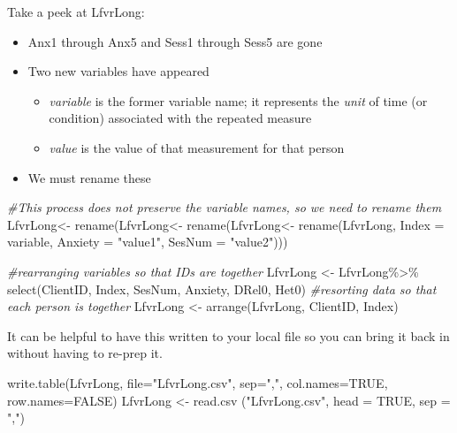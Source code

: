 \documentclass[
  english,
]{book}
\newenvironment{Shaded}{\begin{snugshade}}{\end{snugshade}}
\newcommand{\AttributeTok}[1]{\textcolor[rgb]{0.77,0.63,0.00}{#1}}
\newcommand{\CommentTok}[1]{\textcolor[rgb]{0.56,0.35,0.01}{\textit{#1}}}
\newcommand{\ConstantTok}[1]{\textcolor[rgb]{0.00,0.00,0.00}{#1}}
\newcommand{\FunctionTok}[1]{\textcolor[rgb]{0.00,0.00,0.00}{#1}}
\newcommand{\NormalTok}[1]{#1}
\newcommand{\OtherTok}[1]{\textcolor[rgb]{0.56,0.35,0.01}{#1}}
\newcommand{\SpecialCharTok}[1]{\textcolor[rgb]{0.00,0.00,0.00}{#1}}
\newcommand{\StringTok}[1]{\textcolor[rgb]{0.31,0.60,0.02}{#1}}
\providecommand{\tightlist}{%
  \setlength{\itemsep}{0pt}\setlength{\parskip}{0pt}}
\begin{document}
Take a peek at LfvrLong:

\begin{itemize}
\tightlist
\item
  Anx1 through Anx5 and Sess1 through Sess5 are gone
\item
  Two new variables have appeared

  \begin{itemize}
  \tightlist
  \item
    \emph{variable} is the former variable name; it represents the \emph{unit} of time (or condition) associated with the repeated measure
  \item
    \emph{value} is the value of that measurement for that person
  \end{itemize}
\item
  We must rename these
\end{itemize}

\begin{Shaded}
\begin{Highlighting}[]
\CommentTok{\#This process  does not preserve the variable names, so we need to rename them}
\NormalTok{LfvrLong}\OtherTok{\textless{}{-}}  \FunctionTok{rename}\NormalTok{(LfvrLong}\OtherTok{\textless{}{-}}  \FunctionTok{rename}\NormalTok{(LfvrLong}\OtherTok{\textless{}{-}}  \FunctionTok{rename}\NormalTok{(LfvrLong, }\AttributeTok{Index =}\NormalTok{ variable, }\AttributeTok{Anxiety =} \StringTok{"value1"}\NormalTok{, }\AttributeTok{SesNum =} \StringTok{"value2"}\NormalTok{)))}

\CommentTok{\#rearranging variables so that IDs are together}
\NormalTok{LfvrLong }\OtherTok{\textless{}{-}}\NormalTok{ LfvrLong}\SpecialCharTok{\%\textgreater{}\%}
  \FunctionTok{select}\NormalTok{(ClientID, Index, SesNum, Anxiety, DRel0, Het0)}
\CommentTok{\#resorting data so that each person is together}
\NormalTok{LfvrLong }\OtherTok{\textless{}{-}} \FunctionTok{arrange}\NormalTok{(LfvrLong, ClientID, Index)}
\end{Highlighting}
\end{Shaded}

It can be helpful to have this written to your local file so you can bring it back in without having to re-prep it.

\begin{Shaded}
\begin{Highlighting}[]
\FunctionTok{write.table}\NormalTok{(LfvrLong, }\AttributeTok{file=}\StringTok{"LfvrLong.csv"}\NormalTok{, }\AttributeTok{sep=}\StringTok{","}\NormalTok{, }\AttributeTok{col.names=}\ConstantTok{TRUE}\NormalTok{, }\AttributeTok{row.names=}\ConstantTok{FALSE}\NormalTok{)}
\NormalTok{LfvrLong }\OtherTok{\textless{}{-}} \FunctionTok{read.csv}\NormalTok{ (}\StringTok{"LfvrLong.csv"}\NormalTok{, }\AttributeTok{head =} \ConstantTok{TRUE}\NormalTok{, }\AttributeTok{sep =} \StringTok{","}\NormalTok{)}
\end{Highlighting}
\end{Shaded}
\end{document}
